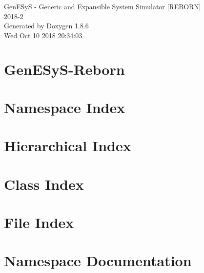 \documentclass[twoside]{book}
\newcommand{\clearemptydoublepage}{%
  \newpage{\pagestyle{empty}\cleardoublepage}%
}
\begin{document}
\hypersetup{pageanchor=false}
\begin{titlepage}
\vspace*{7cm}
\begin{center}%
{\Large Gen\-E\-Sy\-S -\/ Generic and Expansible System Simulator \mbox{[}R\-E\-B\-O\-R\-N\mbox{]} \\[1ex]\large 2018-\/2 }\\
\vspace*{1cm}
{\large Generated by Doxygen 1.8.6}\\
\vspace*{0.5cm}
{\small Wed Oct 10 2018 20:34:03}\\
\end{center}
\end{titlepage}
\clearemptydoublepage
\tableofcontents
\clearemptydoublepage
{}
\hypersetup{pageanchor=true}

\chapter{Gen\-E\-Sy\-S-\/\-Reborn}
\label{md__r_e_a_d_m_e}
\hypertarget{md__r_e_a_d_m_e}{}

\chapter{Namespace Index}

\chapter{Hierarchical Index}

\chapter{Class Index}

\chapter{File Index}

\chapter{Namespace Documentation}

\end{document}
